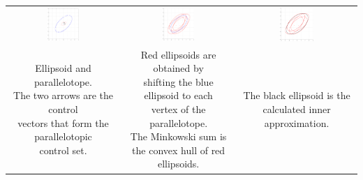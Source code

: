 \documentclass{article}
\begin{document}
\begin{table}[h!]
	\centering
	\begin{tabular}{ccc}
		\includegraphics[width=0.3\textwidth]{union_offset_ia/1.pdf} & \includegraphics[width=0.3\textwidth]{union_offset_ia/2.pdf} & 
		\includegraphics[width=0.3\textwidth]{union_offset_ia/9.pdf}\\
		\makecell{Ellipsoid and parallelotope. \\ The two arrows are the control \\ vectors that form the parallelotopic \\ control set.}& \makecell{Red ellipsoids are obtained by \\ shifting the blue ellipsoid to each \\ vertex of the parallelotope.\\ The Minkowski sum is \\the convex hull of red ellipsoids.} & \makecell{The black ellipsoid is the\\ calculated inner approximation.}
	\end{tabular}
	\label{union_offset_ia1}
\end{table}
\end{document}
